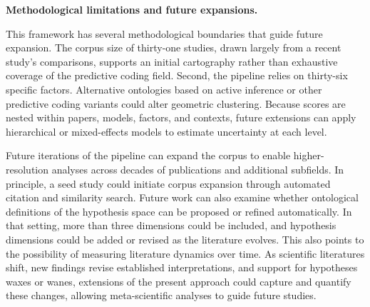 \documentclass[12pt]{article}
\begin{document}
\noindent\textbf{Methodological limitations and future expansions.}

This framework has several methodological boundaries that guide future expansion. The corpus size of thirty-one studies, drawn largely from a recent study's comparisons\cite{ref34}, supports an initial cartography rather than exhaustive coverage of the predictive coding field. Second, the pipeline relies on thirty-six specific factors. Alternative ontologies based on active inference or other predictive coding variants could alter geometric clustering. Because scores are nested within papers, models, factors, and contexts, future extensions can apply hierarchical or mixed-effects models to estimate uncertainty at each level.

Future iterations of the pipeline can expand the corpus to enable higher-resolution analyses across decades of publications and additional subfields. In principle, a seed study could initiate corpus expansion through automated citation and similarity search. Future work can also examine whether ontological definitions of the hypothesis space can be proposed or refined automatically. In that setting, more than three dimensions could be included, and hypothesis dimensions could be added or revised as the literature evolves. This also points to the possibility of measuring literature dynamics over time. As scientific literatures shift, new findings revise established interpretations, and support for hypotheses waxes or wanes, extensions of the present approach could capture and quantify these changes, allowing meta-scientific analyses to guide future studies.
\end{document}
